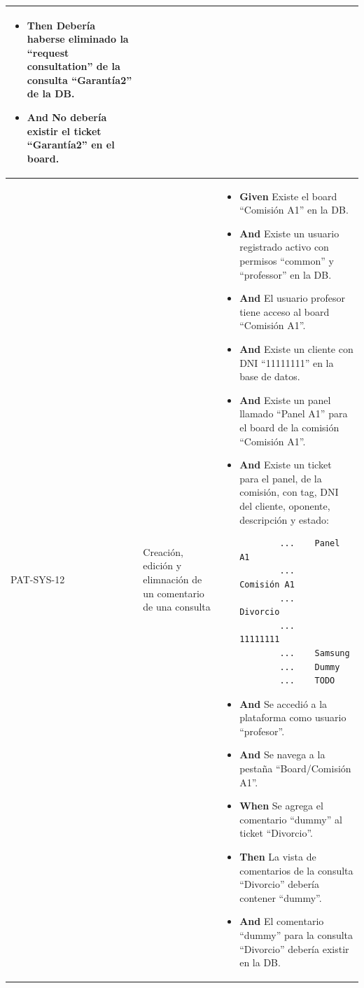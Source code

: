 \begin{longtable}{|p{1cm}|p{2.5cm}|p{12cm}|}
\begin{itemize}
        \item \textbf{Then} Debería haberse eliminado la ``request consultation'' de la consulta ``Garant\'ia2'' de la DB.
        \item \textbf{And} No debería existir el ticket ``Garant\'ia2'' en el board.
        \newline
    \end{itemize}
    \\ 
    \hline
     PAT-SYS-12 & Creación, edición y elimnación de un comentario de una consulta & 
        \begin{itemize}
        \item \textbf{Given} Existe el board ``Comisión A1'' en la DB.
        \item \textbf{And} Existe un usuario registrado activo con permisos ``common'' y ``professor'' en la DB.
        \item \textbf{And} El usuario profesor tiene acceso al board ``Comisión A1''.
        \item \textbf{And} Existe un cliente con DNI ``11111111'' en la base de datos.
        \item \textbf{And} Existe un panel llamado ``Panel A1'' para el board de la comisión ``Comisión A1''.
        \item \textbf{And} Existe un ticket para el panel, de la comisión, con tag, DNI del cliente, oponente, descripción y estado:
        \begin{verbatim}
        ...    Panel A1
        ...    Comisión A1
        ...    Divorcio
        ...    11111111
        ...    Samsung
        ...    Dummy
        ...    TODO
        \end{verbatim}
        \item \textbf{And} Se accedió a la plataforma como usuario ``profesor''.
        \item \textbf{And} Se navega a la pestaña ``Board/Comisión A1''.
        \newline
    
        \item \textbf{When} Se agrega el comentario ``dummy'' al ticket ``Divorcio''.
        \newline
    
        \item \textbf{Then} La vista de comentarios de la consulta ``Divorcio'' debería contener ``dummy''.
        \item \textbf{And} El comentario ``dummy'' para la consulta ``Divorcio'' debería existir en la DB.
        \newline


\end{itemize}
\end{longtable}
